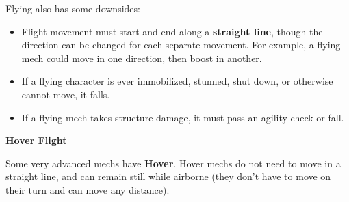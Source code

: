 Flying also has some downsides:
\begin{itemize}
\item Flight movement must start and end along a \textbf{straight line}, though the direction can be changed for each separate movement. For example, a flying mech could move in one direction, then boost in another. 
\item If a flying character is ever immobilized, stunned, shut down, or otherwise cannot move, it falls.
\item If a flying mech takes structure damage, it must pass an agility check or fall.
\end{itemize}



\begin{center}
     \textbf{Hover Flight}
\end{center}

Some very advanced mechs have \textbf{Hover}. Hover mechs do not need to move in a straight line, and can remain still while airborne (they don’t have to move on their turn and can move any distance).